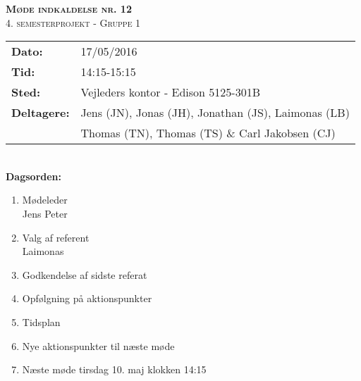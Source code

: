 
\newcommand{\HRule}{\rule{\linewidth}{0.1mm}}


	\begin{center}
		{\huge \bfseries \textsc{Møde indkaldelse nr. 12}}\\
		\textsc{\large 4. semesterprojekt - Gruppe 1}\\[0.3cm]
	\end{center}
	\begin{tabular}{ll}
	\large \textbf{Dato:} & 17/05/2016  \\ %
	\large \textbf{Tid:}  & 14:15-15:15 \\ %
	\large \textbf{Sted:} & Vejleders kontor - Edison 5125-301B		\\ %
	\large \textbf{Deltagere:} & Jens (JN), Jonas (JH), Jonathan (JS), Laimonas (LB) \\
	\large \textbf & Thomas (TN),  Thomas (TS) \& Carl Jakobsen (CJ)\\
	\end{tabular}\\
	\phantom{\,}\hspace{0.1em} \large \textbf{Dagsorden:}
	\begin{enumerate}
		\itemsep 0.3em 
		\item Mødeleder\\
			Jens Peter\\
		\item Valg af referent\\
			Laimonas\\
		\item Godkendelse af sidste referat\\

		\item Opfølgning på aktionspunkter\\
		\item Tidsplan\\
		\item Nye aktionspunkter til næste møde\\
		\item Næste møde tirsdag 10. maj klokken 14:15
	\end{enumerate}

